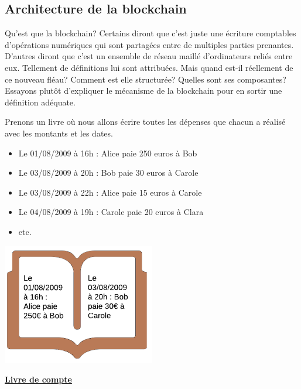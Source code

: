 \documentclass[12pt]{report}
\begin{document}

\newpage
	\subsection{Architecture de la blockchain}

\hspace{1cm} Qu'est que la blockchain? Certains diront que c'est juste une écriture comptables d'opérations numériques qui sont partagées entre de multiples parties prenantes. D'autres diront que c'est un ensemble de réseau maillé d'ordinateurs reliés entre eux. Tellement de définitions lui sont attribuées. Mais quand est-il réellement de ce nouveau fléau? Comment est elle structurée? Quelles sont ses composantes? Essayons plutôt d'expliquer le mécanisme de la blockchain pour en sortir une définition adéquate.

\hspace{1cm} Prenons un livre où nous allons écrire toutes les dépenses que chacun a réalisé avec les montants et les dates.

\begin{itemize}
    \item Le 01/08/2009 à 16h : Alice paie 250 euros à Bob 
    \item Le 03/08/2009 à 20h : Bob paie 30 euros à Carole
    \item Le 03/08/2009 à 22h : Alice paie 15 euros  à Carole
    \item Le 04/08/2009 à 19h : Carole paie 20 euros  à Clara
    \item etc.
\end{itemize}

\begin{center}
    \includegraphics[width=0.5\textwidth]{livre_compte}

    \textbf{\underline{Livre de compte}} \\[1cm]
\end{center}
\end{document}
